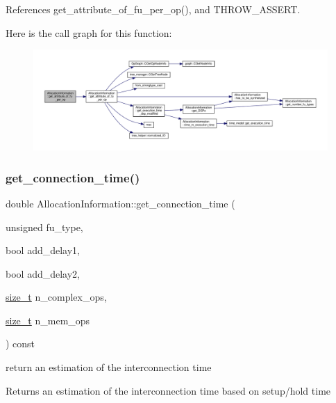 References get\+\_\+attribute\+\_\+of\+\_\+fu\+\_\+per\+\_\+op(), and T\+H\+R\+O\+W\+\_\+\+A\+S\+S\+E\+RT.

Here is the call graph for this function\+:
\nopagebreak
\begin{figure}[H]
\begin{center}
\leavevmode
\includegraphics[width=350pt]{d7/d79/classAllocationInformation_af971b67971b944136aaef74398f7e90d_cgraph}
\end{center}
\end{figure}
\mbox{\label{classAllocationInformation_a94969cbe8576878b499b71b87d4944f0}} 
\subsubsection{\texorpdfstring{get\+\_\+connection\+\_\+time()}{get\_connection\_time()}}
{\footnotesize\ttfamily double Allocation\+Information\+::get\+\_\+connection\+\_\+time (\begin{DoxyParamCaption}\item[{unsigned}]{fu\+\_\+type,  }\item[{bool}]{add\+\_\+delay1,  }\item[{bool}]{add\+\_\+delay2,  }\item[{\hyperlink{tutorial__fpt__2017_2intro_2sixth_2test_8c_a7c94ea6f8948649f8d181ae55911eeaf}{size\+\_\+t}}]{n\+\_\+complex\+\_\+ops,  }\item[{\hyperlink{tutorial__fpt__2017_2intro_2sixth_2test_8c_a7c94ea6f8948649f8d181ae55911eeaf}{size\+\_\+t}}]{n\+\_\+mem\+\_\+ops }\end{DoxyParamCaption}) const}



return an estimation of the interconnection time 

\begin{DoxyReturn}{Returns}
an estimation of the interconnection time based on setup/hold time 
\end{DoxyReturn}


